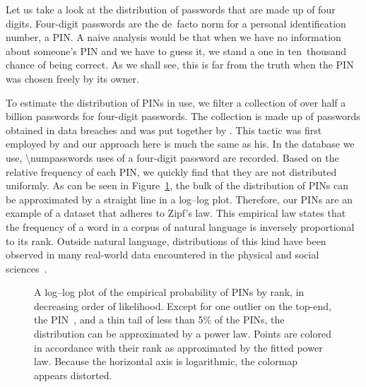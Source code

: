 \begin{example}
\label{ex:pin}%
  Let us take a look at the distribution of passwords that are made up of four digits.
  Four-digit passwords are the de~facto norm for a personal identification number, a PIN.
  A naive analysis would be that when we have no information about someone's PIN and we have to guess it, we stand a one in ten~thousand chance of being correct.
  As we shall see, this is far from the truth when the PIN was chosen freely by its owner.

  To estimate the distribution of PINs in use, we filter a collection of over half a billion passwords for four-digit passwords.
  The collection is made up of passwords obtained in data breaches and was put together by \textcite{hunt2018have}.
  This tactic was first employed by \textcite{berry2012pin} and our approach here is much the same as his.
  In the database we use, \num{\numpasswords} uses of a four-digit password are recorded.
  Based on the relative frequency of each PIN, we quickly find that they are not distributed uniformly.
  As can be seen in Figure~\ref{fig:pinprobability}, the bulk of the distribution of PINs can be approximated by a straight line in a log--log plot.
  Therefore, our PINs are an example of a dataset that adheres to Zipf's law.
  This empirical law states that the frequency of a word in a corpus of natural language is inversely proportional to its rank.
  Outside natural language, distributions of this kind have been observed in many real-world data encountered in the physical and social sciences~\parencite{newman2005power}.
  \begin{figure}
    \centering
    \caption{
      A log--log plot of the empirical probability of PINs by rank, in decreasing order of likelihood.
      Except for one outlier on the top-end, the PIN~, and a thin tail of less than 5\% of the PINs, the distribution can be approximated by a power law.
      Points are colored in accordance with their rank as approximated by the fitted power law.
      Because the horizontal axis is logarithmic, the colormap appears distorted.
    }
    \label{fig:pinprobability}
  \end{figure}


\end{example}
